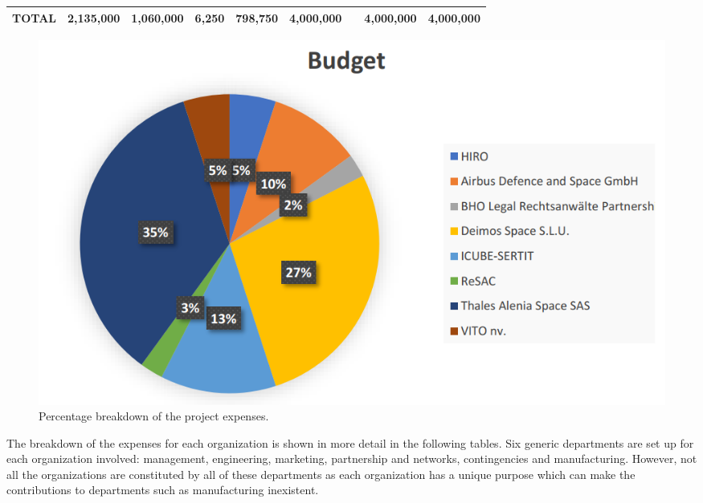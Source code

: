 \begin{table}[H]
{\begin{tabular}{p{5cm}p{2cm}p{2cm}p{2.5cm}p{2cm}p{2cm}p{2cm}p{2cm}p{2cm}}
\textbf{TOTAL}                                                                           & \textbf{2,135,000}                                                                                    & \textbf{1,060,000}                                                                              & \textbf{6,250}                                                                                                 & \textbf{798,750}                                                                           & \textbf{4,000,000}                                                                                         & \textbf{}                                                                                            & \textbf{4,000,000}                                                                                  & \textbf{4,000,000}                                                                                   
\\ \bottomrule[2pt]
\end{tabular}}
\end{table}


\begin{figure}[H]
\centering
\includegraphics[scale=0.5]{./images/budget/budgetPie}
\caption{Percentage breakdown of the project expenses.}
\label{rules}
\end{figure}

The breakdown of the expenses for each organization is shown in more detail in the following tables. Six generic departments are set up for each organization involved: management, engineering, marketing, partnership and networks, contingencies and manufacturing. However, not all the organizations are constituted by all of these departments as each organization has a unique purpose which can make the contributions to departments such as manufacturing inexistent.\\

